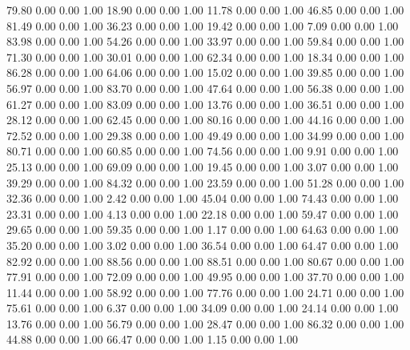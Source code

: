    79.80   0.00   0.00   1.00
   18.90   0.00   0.00   1.00
   11.78   0.00   0.00   1.00
   46.85   0.00   0.00   1.00
   81.49   0.00   0.00   1.00
   36.23   0.00   0.00   1.00
   19.42   0.00   0.00   1.00
    7.09   0.00   0.00   1.00
   83.98   0.00   0.00   1.00
   54.26   0.00   0.00   1.00
   33.97   0.00   0.00   1.00
   59.84   0.00   0.00   1.00
   71.30   0.00   0.00   1.00
   30.01   0.00   0.00   1.00
   62.34   0.00   0.00   1.00
   18.34   0.00   0.00   1.00
   86.28   0.00   0.00   1.00
   64.06   0.00   0.00   1.00
   15.02   0.00   0.00   1.00
   39.85   0.00   0.00   1.00
   56.97   0.00   0.00   1.00
   83.70   0.00   0.00   1.00
   47.64   0.00   0.00   1.00
   56.38   0.00   0.00   1.00
   61.27   0.00   0.00   1.00
   83.09   0.00   0.00   1.00
   13.76   0.00   0.00   1.00
   36.51   0.00   0.00   1.00
   28.12   0.00   0.00   1.00
   62.45   0.00   0.00   1.00
   80.16   0.00   0.00   1.00
   44.16   0.00   0.00   1.00
   72.52   0.00   0.00   1.00
   29.38   0.00   0.00   1.00
   49.49   0.00   0.00   1.00
   34.99   0.00   0.00   1.00
   80.71   0.00   0.00   1.00
   60.85   0.00   0.00   1.00
   74.56   0.00   0.00   1.00
    9.91   0.00   0.00   1.00
   25.13   0.00   0.00   1.00
   69.09   0.00   0.00   1.00
   19.45   0.00   0.00   1.00
    3.07   0.00   0.00   1.00
   39.29   0.00   0.00   1.00
   84.32   0.00   0.00   1.00
   23.59   0.00   0.00   1.00
   51.28   0.00   0.00   1.00
   32.36   0.00   0.00   1.00
    2.42   0.00   0.00   1.00
   45.04   0.00   0.00   1.00
   74.43   0.00   0.00   1.00
   23.31   0.00   0.00   1.00
    4.13   0.00   0.00   1.00
   22.18   0.00   0.00   1.00
   59.47   0.00   0.00   1.00
   29.65   0.00   0.00   1.00
   59.35   0.00   0.00   1.00
    1.17   0.00   0.00   1.00
   64.63   0.00   0.00   1.00
   35.20   0.00   0.00   1.00
    3.02   0.00   0.00   1.00
   36.54   0.00   0.00   1.00
   64.47   0.00   0.00   1.00
   82.92   0.00   0.00   1.00
   88.56   0.00   0.00   1.00
   88.51   0.00   0.00   1.00
   80.67   0.00   0.00   1.00
   77.91   0.00   0.00   1.00
   72.09   0.00   0.00   1.00
   49.95   0.00   0.00   1.00
   37.70   0.00   0.00   1.00
   11.44   0.00   0.00   1.00
   58.92   0.00   0.00   1.00
   77.76   0.00   0.00   1.00
   24.71   0.00   0.00   1.00
   75.61   0.00   0.00   1.00
    6.37   0.00   0.00   1.00
   34.09   0.00   0.00   1.00
   24.14   0.00   0.00   1.00
   13.76   0.00   0.00   1.00
   56.79   0.00   0.00   1.00
   28.47   0.00   0.00   1.00
   86.32   0.00   0.00   1.00
   44.88   0.00   0.00   1.00
   66.47   0.00   0.00   1.00
    1.15   0.00   0.00   1.00
